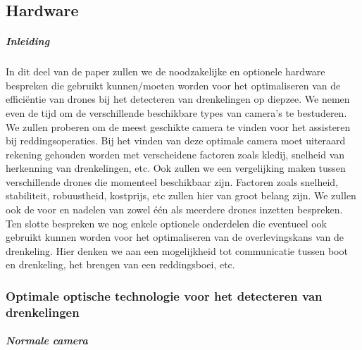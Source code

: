 \chapter{}
\label{ch:stand-van-zaken}



\section{Hardware}

\paragraph{Inleiding}
In dit deel van de paper zullen we de noodzakelijke en optionele hardware bespreken die gebruikt kunnen/moeten worden voor het optimaliseren van de efficiëntie van drones bij het detecteren van drenkelingen op diepzee. We nemen even de tijd om de verschillende beschikbare types van camera's te bestuderen. We zullen proberen om de meest geschikte camera te vinden voor het assisteren bij reddingsoperaties. Bij het vinden van deze optimale camera moet uiteraard rekening gehouden worden met verscheidene factoren zoals kledij, snelheid van herkenning van drenkelingen, etc. Ook zullen we een vergelijking maken tussen verschillende drones die momenteel beschikbaar zijn. Factoren zoals snelheid, stabiliteit, robuustheid, kostprijs, etc zullen hier van groot belang zijn. We zullen ook de voor en nadelen van zowel één als meerdere drones inzetten bespreken. Ten slotte bespreken we nog enkele optionele onderdelen die eventueel ook gebruikt kunnen worden voor het optimaliseren van de overlevingskans van de drenkeling. Hier denken we aan een mogelijkheid tot communicatie tussen boot en drenkeling, het brengen van een reddingsboei, etc.

\subsection{Optimale optische technologie voor het detecteren van drenkelingen}

\paragraph{Normale camera}

